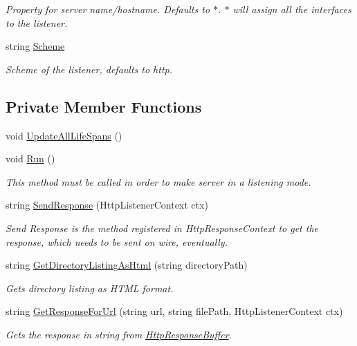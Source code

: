 \begin{DoxyCompactItemize}
\begin{DoxyCompactList}\small\item\em Property for server name/hostname. Defaults to $\ast$. $\ast$ will assign all the interfaces to the listener. \end{DoxyCompactList}\item 
string \mbox{\hyperlink{class_concord_1_1_c3_http_module_1_1_web_server_a372194bcca0a119f079abe7f767dee71}{Scheme}}
\begin{DoxyCompactList}\small\item\em Scheme of the listener, defaults to http. \end{DoxyCompactList}\end{DoxyCompactItemize}
\subsection*{Private Member Functions}
\begin{DoxyCompactItemize}
\item 
void \mbox{\hyperlink{class_concord_1_1_c3_http_module_1_1_web_server_afd9ec2b5e4835ee1e5b59cd248e9c706}{Update\+All\+Life\+Spans}} ()
\item 
void \mbox{\hyperlink{class_concord_1_1_c3_http_module_1_1_web_server_a25053b2c9397975cf48565d98b9c2d9e}{Run}} ()
\begin{DoxyCompactList}\small\item\em This method must be called in order to make server in a listening mode. \end{DoxyCompactList}\item 
string \mbox{\hyperlink{class_concord_1_1_c3_http_module_1_1_web_server_ac9786f7a42e9d04a8c8bda5ff7caa482}{Send\+Response}} (Http\+Listener\+Context ctx)
\begin{DoxyCompactList}\small\item\em Send Response is the method registered in Http\+Response\+Context to get the response, which needs to be sent on wire, eventually. \end{DoxyCompactList}\item 
string \mbox{\hyperlink{class_concord_1_1_c3_http_module_1_1_web_server_a2692917da9b294c53f5151c86409f726}{Get\+Directory\+Listing\+As\+Html}} (string directory\+Path)
\begin{DoxyCompactList}\small\item\em Gets directory listing as H\+T\+ML format. \end{DoxyCompactList}\item 
string \mbox{\hyperlink{class_concord_1_1_c3_http_module_1_1_web_server_a406b1bfca1b92cedbfb0bdb792ae275f}{Get\+Response\+For\+Url}} (string url, string file\+Path, Http\+Listener\+Context ctx)
\begin{DoxyCompactList}\small\item\em Gets the response in string from \mbox{\hyperlink{class_concord_1_1_c3_http_module_1_1_http_response_buffer}{Http\+Response\+Buffer}}. \end{DoxyCompactList}\end{DoxyCompactItemize}
